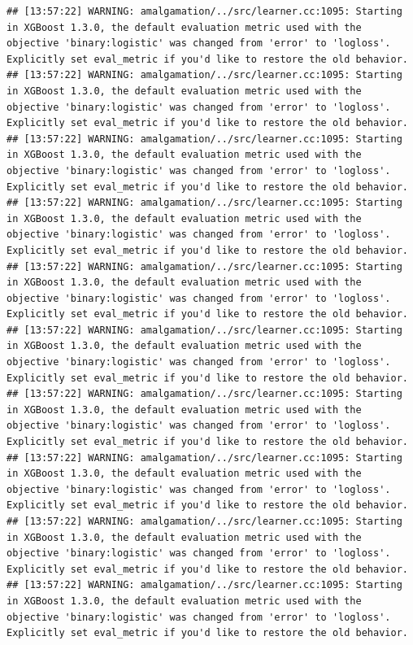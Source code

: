 \documentclass[
]{scrbook}
\begin{document}
\begin{verbatim}
## [13:57:22] WARNING: amalgamation/../src/learner.cc:1095: Starting in XGBoost 1.3.0, the default evaluation metric used with the objective 'binary:logistic' was changed from 'error' to 'logloss'. Explicitly set eval_metric if you'd like to restore the old behavior.
## [13:57:22] WARNING: amalgamation/../src/learner.cc:1095: Starting in XGBoost 1.3.0, the default evaluation metric used with the objective 'binary:logistic' was changed from 'error' to 'logloss'. Explicitly set eval_metric if you'd like to restore the old behavior.
## [13:57:22] WARNING: amalgamation/../src/learner.cc:1095: Starting in XGBoost 1.3.0, the default evaluation metric used with the objective 'binary:logistic' was changed from 'error' to 'logloss'. Explicitly set eval_metric if you'd like to restore the old behavior.
## [13:57:22] WARNING: amalgamation/../src/learner.cc:1095: Starting in XGBoost 1.3.0, the default evaluation metric used with the objective 'binary:logistic' was changed from 'error' to 'logloss'. Explicitly set eval_metric if you'd like to restore the old behavior.
## [13:57:22] WARNING: amalgamation/../src/learner.cc:1095: Starting in XGBoost 1.3.0, the default evaluation metric used with the objective 'binary:logistic' was changed from 'error' to 'logloss'. Explicitly set eval_metric if you'd like to restore the old behavior.
## [13:57:22] WARNING: amalgamation/../src/learner.cc:1095: Starting in XGBoost 1.3.0, the default evaluation metric used with the objective 'binary:logistic' was changed from 'error' to 'logloss'. Explicitly set eval_metric if you'd like to restore the old behavior.
## [13:57:22] WARNING: amalgamation/../src/learner.cc:1095: Starting in XGBoost 1.3.0, the default evaluation metric used with the objective 'binary:logistic' was changed from 'error' to 'logloss'. Explicitly set eval_metric if you'd like to restore the old behavior.
## [13:57:22] WARNING: amalgamation/../src/learner.cc:1095: Starting in XGBoost 1.3.0, the default evaluation metric used with the objective 'binary:logistic' was changed from 'error' to 'logloss'. Explicitly set eval_metric if you'd like to restore the old behavior.
## [13:57:22] WARNING: amalgamation/../src/learner.cc:1095: Starting in XGBoost 1.3.0, the default evaluation metric used with the objective 'binary:logistic' was changed from 'error' to 'logloss'. Explicitly set eval_metric if you'd like to restore the old behavior.
## [13:57:22] WARNING: amalgamation/../src/learner.cc:1095: Starting in XGBoost 1.3.0, the default evaluation metric used with the objective 'binary:logistic' was changed from 'error' to 'logloss'. Explicitly set eval_metric if you'd like to restore the old behavior.

\end{verbatim}
\end{document}
